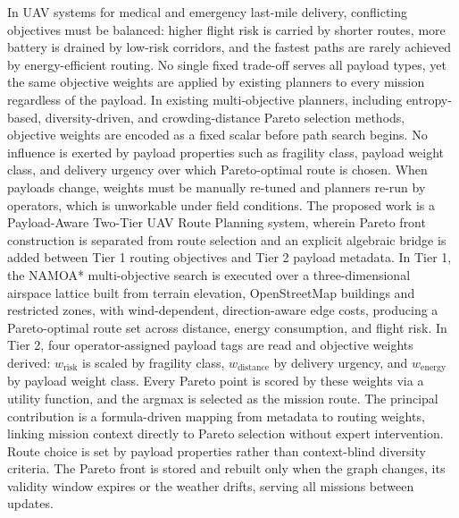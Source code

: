 \documentclass{ssnreview}
\begin{document}
\makereviewtitle
\reviewfrontmatter

\begin{reviewabstract}
In UAV systems for medical and emergency last-mile delivery, conflicting objectives
must be balanced: higher flight risk is carried by shorter routes, more battery is
drained by low-risk corridors, and the fastest paths are rarely achieved by
energy-efficient routing. No single fixed trade-off serves all payload types, yet the
same objective weights are applied by existing planners to every mission regardless of
the payload. In existing multi-objective planners, including entropy-based,
diversity-driven, and crowding-distance Pareto selection methods, objective weights are
encoded as a fixed scalar before path search begins. No influence is exerted by payload
properties such as fragility class, payload weight class, and delivery urgency over
which Pareto-optimal route is chosen. When payloads change, weights must be manually
re-tuned and planners re-run by operators, which is unworkable under field conditions.
The proposed work is a Payload-Aware Two-Tier UAV Route Planning system, wherein Pareto
front construction is separated from route selection and an explicit algebraic bridge
is added between Tier 1 routing objectives and Tier 2 payload metadata. In Tier 1, the
NAMOA* multi-objective search is executed over a three-dimensional airspace lattice
built from terrain elevation, OpenStreetMap buildings and restricted zones, with
wind-dependent, direction-aware edge costs, producing a Pareto-optimal route set across
distance, energy consumption, and flight risk. In Tier 2, four operator-assigned payload
tags are read and objective weights derived: $w_\mathrm{risk}$ is scaled by fragility
class, $w_\mathrm{distance}$ by delivery urgency, and $w_\mathrm{energy}$ by payload
weight class. Every Pareto point is scored by these weights via a utility function, and
the argmax is selected as the mission route. The principal contribution is a
formula-driven mapping from metadata to routing weights, linking mission context
directly to Pareto selection without expert intervention. Route choice is set by payload
properties rather than context-blind diversity criteria. The Pareto front is stored and
rebuilt only when the graph changes, its validity window expires or the weather drifts,
serving all missions between updates.

\end{reviewabstract}
\end{document}
